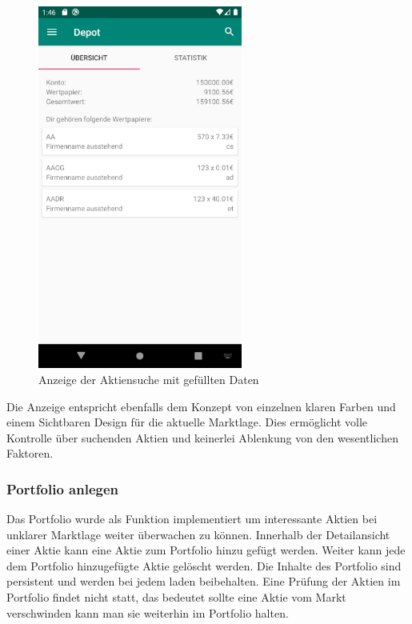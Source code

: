 \documentclass[10pt]{scrartcl}
\begin{document}
\begin{figure}[H]
	\centering
	\includegraphics[width=0.6\textwidth]{Bilder/Prsi/einstieg.png}
	\caption{Anzeige der Aktiensuche mit gefüllten Daten}
\end{figure}

Die Anzeige entspricht ebenfalls dem Konzept von einzelnen klaren Farben und einem Sichtbaren Design für die aktuelle Marktlage. Dies ermöglicht volle Kontrolle über suchenden Aktien und keinerlei Ablenkung von den wesentlichen Faktoren.

\subsubsection{Portfolio anlegen}

Das Portfolio wurde als Funktion implementiert um interessante Aktien bei unklarer Marktlage weiter überwachen zu können. Innerhalb der Detailansicht einer Aktie kann eine Aktie zum Portfolio hinzu gefügt werden. Weiter kann jede dem Portfolio hinzugefügte Aktie gelöscht werden. Die Inhalte des Portfolio sind persistent und werden bei jedem laden beibehalten. Eine Prüfung der Aktien im Portfolio findet nicht statt, das bedeutet sollte eine Aktie vom Markt verschwinden kann man sie weiterhin im Portfolio halten.
\end{document}
